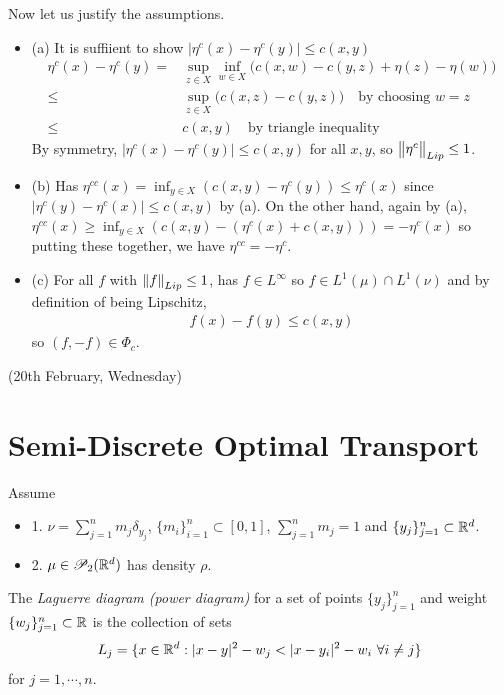 \documentclass[12pt,a4paper]{article}
\newenvironment{proof}
{\begin{changemargin}{1cm}{0.5cm} 
	}%
	{\end{changemargin}
}
\renewenvironment{i}
{\begin{itemize} 
	}%
	{\end{itemize}
}
\newenvironment{p}
{\begin{proof} 
	}%
	{\end{proof}
}
\begin{document}
\begin{p}
Now let us justify the assumptions.
\begin{i}
\item[(a)] It is suffiient to show $|\eta^c(x) - \eta^c(y)| \leq c(x,y)$
\begin{align*}
\eta^c (x) - \eta^c(y) =& \sup_{z\in X} \inf_{w\in X}\big( c(x,w) - c(y, z) + \eta(z) - \eta(w) \big) \\
\leq& \sup_{z\in X} \big( c(x,z) - c(y,z) \big) \quad \text{by choosing } w=z \\
\leq& c(x,y) \quad \text{by triangle inequality}  
\end{align*}
By symmetry, $|\eta^c (x) - \eta^c(y)| \leq c(x,y)$ for all $x,y$, so $\bigl\lVert\eta^c\bigr\rVert_{Lip} \leq 1$.
\item[(b)] Has $\eta^{cc}(x) = \inf_{y\in X}(c(x,y) - \eta^c(y)) \leq \eta^c(x)$ since $|\eta^c(y) - \eta^c(x)| \leq c(x,y)$ by (a). On the other hand, again by (a), $\eta^{cc}(x) \geq \inf_{y\in X} (c(x,y) - (\eta^c(x) + c(x,y))) = -\eta^c(x)$ so putting these together, we have $\eta^{cc} = -\eta^c$.
\item[(c)] For all $f$ with $\snorms{f}{Lip}\leq1$, has $f\in L^{\infty}$ so $f\in L^1(\mu) \cap L^1(\nu)$ and by definition of being Lipschitz, 
\begin{align*}
f(x) - f(y) \leq c(x,y)
\end{align*}
so $(f, -f) \in \Phi_c$.
\end{i}

\eop
\end{p}

\newday

(20th February, Wednesday)


\section{Semi-Discrete Optimal Transport}

Assume
\begin{i}
\item[1.] $\nu = \sum_{j=1}^n m_{j} \delta_{y_j}$, $\{m_i\}_{i=1}^n \subset [0,1]$, $\sum_{j=1}^n m_j =1$ and $\{y_j \}_{j=1}^n \subset \mathbb{R}^d$.
\item[2.] $\mu \in \mathscr{P}_2(\mathbb{R}^d)$ has density $\rho$.  
\end{i}
\s

 The \emph{Laguerre diagram (power diagram)} for a set of points $\{y_j\}_{j=1}^n$ and weight $\{w_j\}_{j=1}^n\subset \mathbb{R}$ is the collection of sets
\begin{align*}
L_j = \{x\in \mathbb{R}^d : |x-y|^2 - w_j < |x-y_i|^2 - w_i \,\, \forall i\neq j\}
\end{align*}
for $j=1, \cdots, n$.
\s
\end{document}
